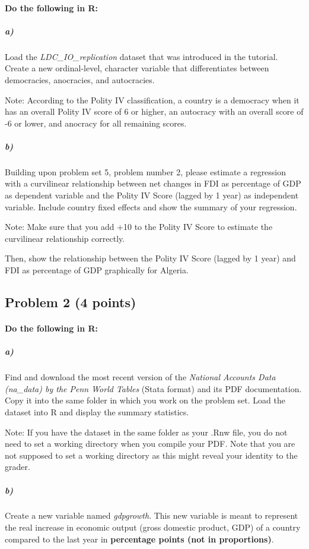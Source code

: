 \documentclass[12pt]{article}
\begin{document}
\paragraph{Do the following in R:}

\subparagraph{a)} Load the \textit{LDC\_IO\_replication} dataset that was introduced in the tutorial. Create a new ordinal-level, character variable that differentiates between democracies, anocracies, and autocracies.

Note: According to the Polity IV classification, a country is a democracy when it has an overall Polity IV score of 6 or higher, an autocracy with an overall score of -6 or lower, and anocracy for all remaining scores.

\subparagraph{b)} Building upon problem set 5, problem number 2, please estimate a regression with a curvilinear relationship between net changes in FDI as percentage of GDP as dependent variable and the Polity IV Score (lagged by 1 year) as independent variable. Include country fixed effects and show the summary of your regression.

Note: Make sure that you add +10 to the Polity IV Score to estimate the curvilinear relationship correctly.

Then, show the relationship between the Polity IV Score (lagged by 1 year) and FDI as percentage of GDP graphically for Algeria.



\subsection*{Problem 2 (4 points)}

\paragraph{Do the following in R:}

\subparagraph{a)} Find and download the most recent version of the \textit{National Accounts Data (na\_data) by the Penn World Tables} (Stata format) and its PDF documentation. Copy it into the same folder in which you work on the problem set. Load the dataset into R and display the summary statistics.

Note: If you have the dataset in the same folder as your .Rnw file, you do not need to set a working directory when you compile your PDF. Note that you are not supposed to set a working directory as this might reveal your identity to the grader.

\subparagraph{b)} Create a new variable named \textit{gdpgrowth}. This new variable is meant to represent the real increase in economic output (gross domestic product, GDP) of a country compared to the last year in \textbf{percentage points (not in proportions)}.
\end{document}
